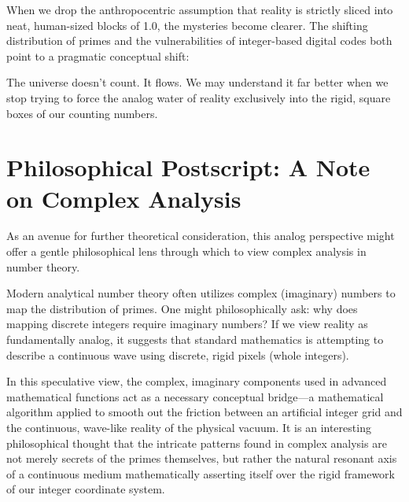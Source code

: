\documentclass[12pt]{article}
\begin{document}
When we drop the anthropocentric assumption that reality is strictly sliced into neat, human-sized blocks of 1.0, the mysteries become clearer. The shifting distribution of primes and the vulnerabilities of integer-based digital codes both point to a pragmatic conceptual shift:

The universe doesn't count. It flows. We may understand it far better when we stop trying to force the analog water of reality exclusively into the rigid, square boxes of our counting numbers.

\section{Philosophical Postscript: A Note on Complex Analysis}
As an avenue for further theoretical consideration, this analog perspective might offer a gentle philosophical lens through which to view complex analysis in number theory. 

Modern analytical number theory often utilizes complex (imaginary) numbers to map the distribution of primes. One might philosophically ask: why does mapping discrete integers require imaginary numbers? If we view reality as fundamentally analog, it suggests that standard mathematics is attempting to describe a continuous wave using discrete, rigid pixels (whole integers). 

In this speculative view, the complex, imaginary components used in advanced mathematical functions act as a necessary conceptual bridge---a mathematical algorithm applied to smooth out the friction between an artificial integer grid and the continuous, wave-like reality of the physical vacuum. It is an interesting philosophical thought that the intricate patterns found in complex analysis are not merely secrets of the primes themselves, but rather the natural resonant axis of a continuous medium mathematically asserting itself over the rigid framework of our integer coordinate system.
\end{document}
